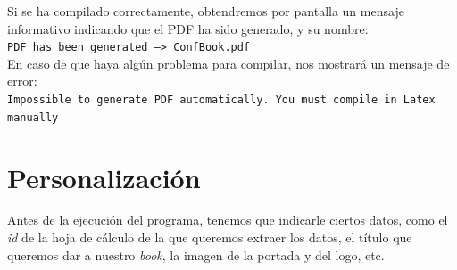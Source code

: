 \documentclass[a4paper, 12pt]{book}
\begin{document}
Si se ha compilado correctamente, obtendremos por pantalla un mensaje informativo indicando que el PDF ha sido generado, y su nombre:\\
\texttt{PDF has been generated --> ConfBook.pdf}\\

En caso de que haya algún problema para compilar, nos mostrará un mensaje de error:\\
\texttt{Impossible to generate PDF automatically. You must compile in Latex manually}


\section{Personalización}
Antes de la ejecución del programa, tenemos que indicarle ciertos datos, como el \textit{id} de la hoja de cálculo de la que queremos extraer los datos, el título que queremos dar a nuestro \textit{book}, la imagen de la portada y del logo, etc.\\
\end{document}
